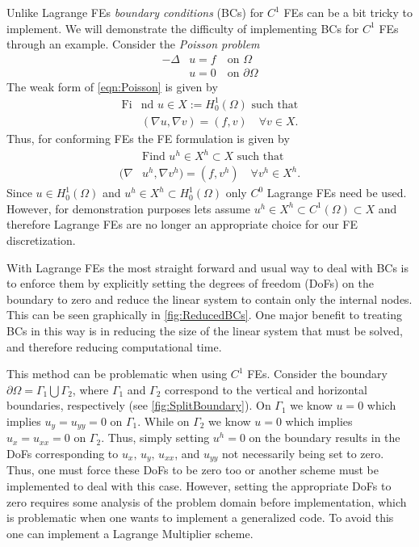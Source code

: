 Unlike Lagrange FEs \emph{boundary conditions} (BCs) for $C^1$ FEs can be a bit
tricky to implement. We will demonstrate the difficulty of implementing BCs for
$C^1$ FEs through an example. Consider the \emph{Poisson problem}
\begin{equation}
  \begin{split}
    -\Delta &u = f \quad \text{on } \Omega \\
    &u = 0 \quad \text{on } \partial \Omega
  \end{split}
  \label{eqn:Poisson}
\end{equation}
The weak form of \eqref{eqn:Poisson} is given by
\begin{equation}
  \begin{split}
    \text{Fi}&\text{nd }u \in X := H^1_0(\Omega) \text{ such that} \\
    &(\nabla u, \nabla v) = (f, v) \quad \forall v \in X.
  \end{split}
  \label{eqn:PoissonWeak}
\end{equation}
Thus, for conforming FEs the FE formulation is given by
\begin{equation}
  \begin{split}
    &\text{Find }u^h \in X^h \subset X \text{ such that} \\
    (\nabla &u^h, \nabla v^h) = (f, v^h) \quad \forall v^h \in X^h.
  \end{split}
  \label{eqn:PoissonFE}
\end{equation}
Since $u \in H^1_0(\Omega)$ and $u^h \in X^h \subset H^1_0(\Omega)$ only $C^0$
Lagrange FEs need be used. However, for demonstration purposes lets assume $u^h
\in X^h \subset C^1(\Omega) \subset X$ and therefore Lagrange FEs are no longer
an appropriate choice for our FE discretization.

With Lagrange FEs the most straight forward and usual way to deal with BCs is to
enforce them by explicitly setting the degrees of freedom (DoFs) on the boundary
to zero and reduce the linear system to contain only the internal nodes. This
can be seen graphically in \autoref{fig:ReducedBCs}. One major benefit to
treating BCs in this way is in reducing the size of the linear system that must
be solved, and therefore reducing computational time.


This method can be problematic when using $C^1$ FEs. Consider the boundary
$\partial \Omega = \Gamma_1 \bigcup \Gamma_2$, where $\Gamma_1$ and $\Gamma_2$
correspond to the vertical and horizontal boundaries, respectively (see
\autoref{fig:SplitBoundary}).  On $\Gamma_1$ we know $u=0$ which implies $u_y =
u_{yy} = 0$ on $\Gamma_1$.  While on $\Gamma_2$ we know $u=0$ which implies $u_x
= u_{xx} = 0$ on $\Gamma_2$. Thus, simply setting $u^h = 0$ on the boundary
results in the DoFs corresponding to $u_x,\,u_y,\,u_{xx}$, and $u_{yy}$ not
necessarily being set to zero. Thus, one must force these DoFs to be zero too or
another scheme must be implemented to deal with this case. However, setting the
appropriate DoFs to zero requires some analysis of the problem domain before
implementation, which is problematic when one wants to implement a generalized
code. To avoid this one can implement a Lagrange Multiplier scheme.


